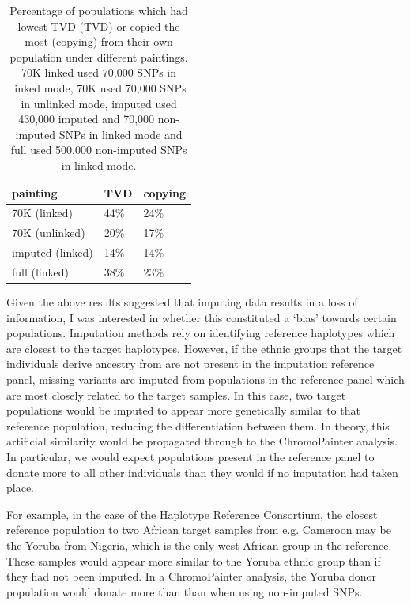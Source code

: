 \begin{table}
\centering
\small
\begin{tabular}{l|l|l}
\hline
painting & TVD & copying\\
\hline
70K (linked) & 44\% & 24\%\\
\hline
70K (unlinked) & 20\% & 17\%\\
\hline
imputed (linked) & 14\% & 14\%\\
\hline
full (linked) & 38\% & 23\%\\
\hline
\end{tabular}
\caption{Percentage of populations which had lowest TVD (TVD) or copied the most (copying) from their own population under different paintings. 70K linked used 70,000 SNPs in linked mode, 70K used 70,000 SNPs in unlinked mode, imputed used 430,000 imputed and 70,000 non-imputed SNPs in linked mode and full used 500,000 non-imputed SNPs in linked mode.}
\label{table:TVD_copying}
\end{table}

Given the above results suggested that imputing data results in a loss of information, I was interested in whether this constituted a `bias' towards certain populations. Imputation methods rely on identifying reference haplotypes which are closest to the target haplotypes. However, if the ethnic groups that the target individuals derive ancestry from are not present in the imputation reference panel, missing variants are imputed from populations in the reference panel which are most closely related to the target samples. In this case, two target populations would be imputed to appear more genetically similar to that reference population, reducing the differentiation between them. In theory, this artificial similarity would be propagated through to the ChromoPainter analysis. In particular, we would expect populations present in the reference panel to donate more to all other individuals than they would if no imputation had taken place.  

For example, in the case of the Haplotype Reference Consortium, the closest reference population to two African target samples from e.g. Cameroon may be the Yoruba from Nigeria, which is the only west African group in the reference. These samples would appear more similar to the Yoruba ethnic group than if they had not been imputed. In a ChromoPainter analysis, the Yoruba donor population would donate more than than when using non-imputed SNPs.    

